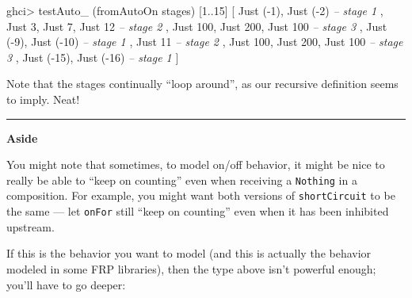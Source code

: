 \documentclass[]{article}
\newenvironment{Shaded}{}{}
\newcommand{\DataTypeTok}[1]{\textcolor[rgb]{0.56,0.13,0.00}{{#1}}}
\newcommand{\DecValTok}[1]{\textcolor[rgb]{0.25,0.63,0.44}{{#1}}}
\newcommand{\CommentTok}[1]{\textcolor[rgb]{0.38,0.63,0.69}{\textit{{#1}}}}
\newcommand{\FunctionTok}[1]{\textcolor[rgb]{0.02,0.16,0.49}{{#1}}}
\newcommand{\NormalTok}[1]{{#1}}
\begin{document}
\begin{Shaded}
\begin{Highlighting}[]
\NormalTok{ghci}\FunctionTok{>} \NormalTok{testAuto_ (fromAutoOn stages) [}\DecValTok{1}\FunctionTok{..}\DecValTok{15}\NormalTok{]}
\NormalTok{[ }\DataTypeTok{Just} \NormalTok{(}\FunctionTok{-}\DecValTok{1}\NormalTok{), }\DataTypeTok{Just} \NormalTok{(}\FunctionTok{-}\DecValTok{2}\NormalTok{)              }\CommentTok{-- stage 1}
\NormalTok{, }\DataTypeTok{Just} \DecValTok{3}\NormalTok{, }\DataTypeTok{Just} \DecValTok{7}\NormalTok{, }\DataTypeTok{Just} \DecValTok{12}           \CommentTok{-- stage 2}
\NormalTok{, }\DataTypeTok{Just} \DecValTok{100}\NormalTok{, }\DataTypeTok{Just} \DecValTok{200}\NormalTok{, }\DataTypeTok{Just} \DecValTok{100}      \CommentTok{-- stage 3}
\NormalTok{, }\DataTypeTok{Just} \NormalTok{(}\FunctionTok{-}\DecValTok{9}\NormalTok{), }\DataTypeTok{Just} \NormalTok{(}\FunctionTok{-}\DecValTok{10}\NormalTok{)             }\CommentTok{-- stage 1}
\NormalTok{, }\DataTypeTok{Just} \DecValTok{11}                           \CommentTok{-- stage 2}
\NormalTok{, }\DataTypeTok{Just} \DecValTok{100}\NormalTok{, }\DataTypeTok{Just} \DecValTok{200}\NormalTok{, }\DataTypeTok{Just} \DecValTok{100}      \CommentTok{-- stage 3}
\NormalTok{, }\DataTypeTok{Just} \NormalTok{(}\FunctionTok{-}\DecValTok{15}\NormalTok{), }\DataTypeTok{Just} \NormalTok{(}\FunctionTok{-}\DecValTok{16}\NormalTok{)            }\CommentTok{-- stage 1}
\NormalTok{]}
\end{Highlighting}
\end{Shaded}

Note that the stages continually ``loop around'', as our recursive
definition seems to imply. Neat!

\begin{center}\rule{0.5\linewidth}{\linethickness}\end{center}

\textbf{Aside}

You might note that sometimes, to model on/off behavior, it might be
nice to really be able to ``keep on counting'' even when receiving a
\texttt{Nothing} in a composition. For example, you might want both
versions of \texttt{shortCircuit} to be the same --- let \texttt{onFor}
still ``keep on counting'' even when it has been inhibited upstream.

If this is the behavior you want to model (and this is actually the
behavior modeled in some FRP libraries), then the type above isn't
powerful enough; you'll have to go deeper:
\end{document}
